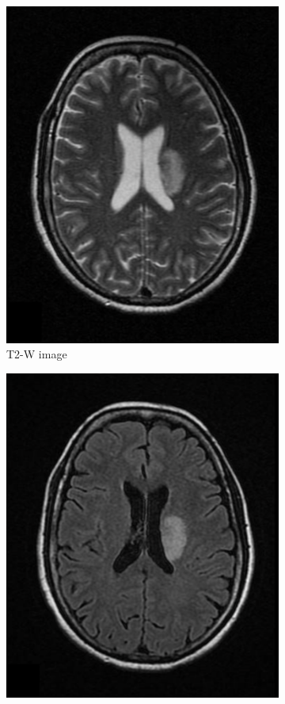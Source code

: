 \documentclass{standalone}
\begin{document}
\begin{figure}[h!]
\begin{subfigure}[b]{0.325\textwidth}
             \includegraphics[scale=0.365]{img/Chap1/T2_example.png}
             \caption{T2-W image}
             \label{fig:T2_example}
        \end{subfigure}
        \hfill
        \begin{subfigure}[b]{0.325\textwidth}
             \includegraphics[scale=0.365]{img/Chap1/FLAIR_example.png}

\end{subfigure}
\end{figure}
\end{document}
